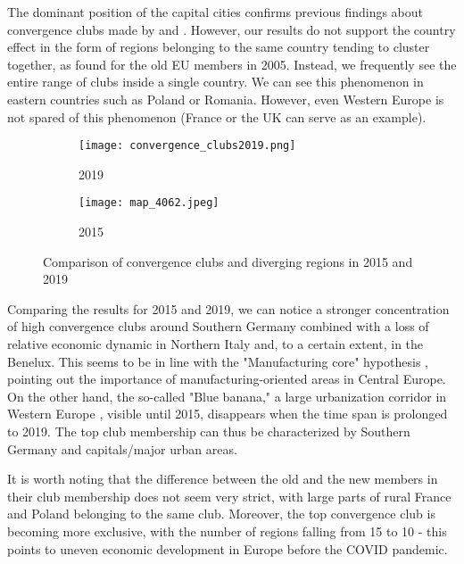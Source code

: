 \documentclass[11pt]{article}
\begin{document}
The dominant position of the capital cities confirms previous findings about convergence clubs made by \citet{sme2012regional} and \citet{bartkowska2012regional}. However, our results do not support the country effect in the form of regions belonging to the same country tending to cluster together, as \citet{bartkowska2012regional} found for the old EU members in 2005. Instead, we frequently see the entire range of clubs inside a single country. We can see this phenomenon in eastern countries such as Poland or Romania. However,
even Western Europe is not spared of this phenomenon (France or the UK can serve as an example).


\begin{figure}[!htbp]%
\centering
\begin{subfigure}[c]{0.75\linewidth}
  {
  \texttt{[image: convergence\_clubs2019.png]}
    \caption{2019}
    \label{clubs_graphic_2019}
  }
\end{subfigure}
\qquad
\begin{subfigure}[c]{0.75\linewidth}
  \texttt{[image: map\_4062.jpeg]}
  \caption{2015}
  \label{clubs_graphic_2015}
\end{subfigure}
  \caption{Comparison of convergence clubs and diverging regions in 2015 and 2019}
\label{clubs_graphic}
\end{figure} 


Comparing the results for 2015 and 2019, we can notice a stronger concentration of high convergence clubs around Southern Germany combined with a loss of relative economic dynamic in Northern Italy and, to a certain extent, in the Benelux. This seems to be in line with the "Manufacturing core" hypothesis \citep{cutrini2019economic, stollinger2016structural}, pointing out the importance of manufacturing-oriented areas in Central Europe. On the other hand, the so-called "Blue banana," a large urbanization corridor in Western Europe \citep{hospers2002beyond}, visible until 2015, disappears when the time span is prolonged to 2019. The top club membership can thus be characterized by Southern Germany and capitals/major urban areas.

It is worth noting that the difference between the old and the new members in their club membership does not seem very strict, with large parts of rural France and Poland belonging to the same club. Moreover, the top convergence club is becoming more exclusive, with the number of regions falling from 15 to 10 - this points to uneven economic development in Europe before the COVID pandemic.
\end{document}
